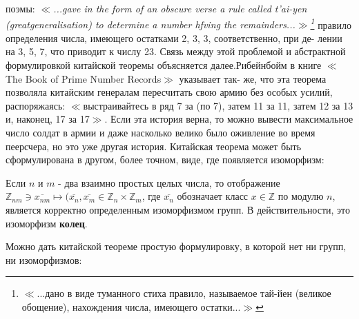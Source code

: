 поэмы: \textit{$\ll$...gave in the form of an obscure verse a rule called t'ai-yen (great\linebreak generalisation) to determine a number hfving the remainders...$\gg$\footnote{$\ll$...дано в виде туманного стиха правило, называемое тай-йен (великое обощение), нахождения числа, имеющего остатки...$\gg$}} правило \linebreak определения числа, имеющего остатками 2, 3, 3, соответственно, при де- \linebreak лении на 3, 5, 7, что приводит к числу 23. Связь между этой проблемой \linebreak и абстрактной формулировкой китайской теоремы объясняется далее.\linebreak Рибейнбойм в книге $\ll$The Book of Prime Number Records$\gg$ указывает так- \linebreak же, что эта теорема позволяла китайским генералам пересчитать свою \linebreak армию без особых усилий, распоряжаясь: $\ll$выстраивайтесь в ряд 7 за (по 7), затем 11 за 11, затем 12 за 13 и, наконец, 17 за 17$\gg$. Если эта \linebreak история верна, то можно вывести максимальное число солдат в армии \linebreak и даже насколько велико было оживление во время пеерсчера, но это \linebreak уже другая история. Китайская теорема может быть сформулирована \linebreak в другом, более точном, виде, где появляется изоморфизм:  
\begin{thm}

  Если $n$ и $m$ - два взаимно простых целых числа, то отображение\linebreak
$\mathbb{Z}_{nm}\ni \overline{x_{nm}}\mapsto(\overline{x_n},\overline{x_m}\in \mathbb{Z}_n \times\mathbb{Z}_m$, где $\overline{x_n}$ обозначает класс $x \in \mathbb{Z}$ по \linebreak модулю $n$, является корректно определенным изоморфизмом групп. В \linebreak действительности, это изоморфизм \textbf{колец}.
 \end{thm}
  Можно дать китайской теореме простую формулировку, в которой \linebreak нет ни групп, ни изоморфизмов:   
